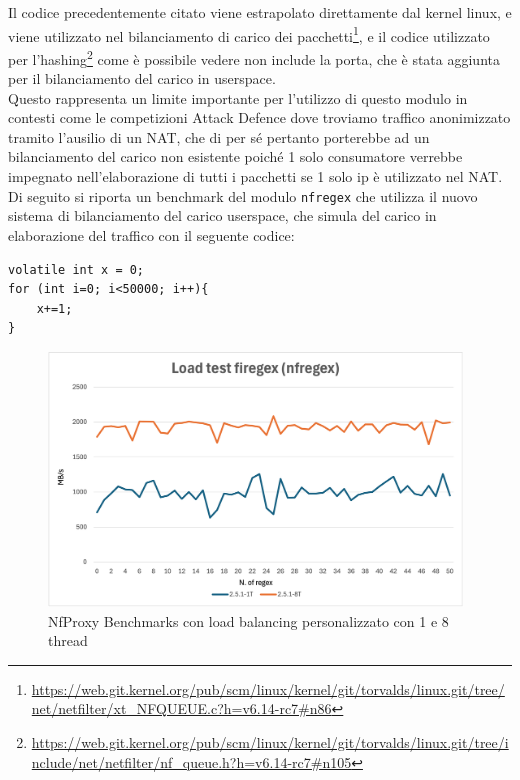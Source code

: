 Il codice precedentemente citato viene estrapolato direttamente dal kernel linux, e 
viene utilizzato nel bilanciamento di carico dei pacchetti\footnote{\url{https://web.git.kernel.org/pub/scm/linux/kernel/git/torvalds/linux.git/tree/net/netfilter/xt_NFQUEUE.c?h=v6.14-rc7\#n86}},
e il codice utilizzato per l'hashing\footnote{\url{https://web.git.kernel.org/pub/scm/linux/kernel/git/torvalds/linux.git/tree/include/net/netfilter/nf_queue.h?h=v6.14-rc7\#n105}}
come è possibile vedere non include la porta, che è stata aggiunta per il bilanciamento del carico in userspace.\\

Questo rappresenta un limite importante per l'utilizzo di questo modulo in contesti come le competizioni Attack Defence dove
troviamo traffico anonimizzato tramito l'ausilio di un NAT, che di per sé pertanto porterebbe
ad un bilanciamento del carico non esistente poiché 1 solo consumatore verrebbe impegnato nell'elaborazione di tutti i pacchetti
se 1 solo ip è utilizzato nel NAT.\\
Di seguito si riporta un benchmark del modulo \texttt{nfregex} che utilizza il nuovo sistema di bilanciamento del carico userspace,
che simula del carico in elaborazione del traffico con il seguente codice:

\begin{listing}[H]
    \begin{verbatim}
volatile int x = 0;
for (int i=0; i<50000; i++){
    x+=1;
}
\end{verbatim}
\end{listing}

\begin{figure}[H]
    \centering
    \includegraphics[width=0.98\textwidth]{images/chapter3/Benchmark-chart-with-load.png}
    \caption{NfProxy Benchmarks con load balancing personalizzato con 1 e 8 thread}\label{fig:nfproxy_multithread_benchmark}
\end{figure}

